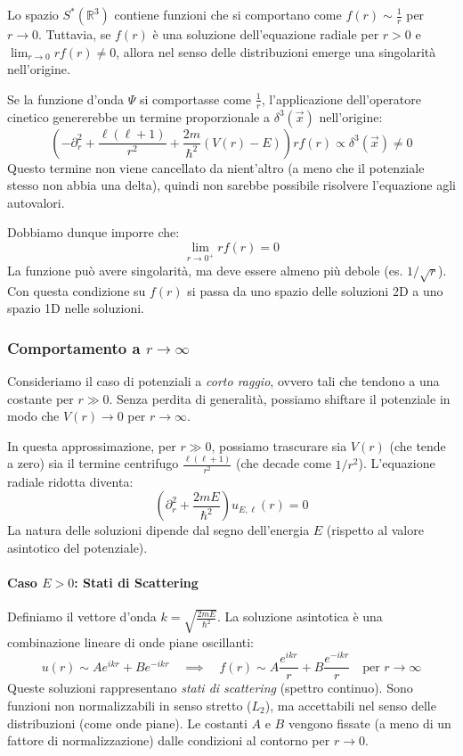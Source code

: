 Lo spazio \( S^*(\mathbb{R}^3) \) contiene funzioni che si comportano come \( f(r) \sim \frac{1}{r} \) per \( r \to 0 \).
Tuttavia, se \( f(r) \) è una soluzione dell'equazione radiale per \( r > 0 \) e \( \lim_{r\to 0} r f(r) \neq 0 \), allora nel senso delle distribuzioni emerge una singolarità nell'origine.

Se la funzione d'onda \( \Psi \) si comportasse come \( \frac{1}{r} \), l'applicazione dell'operatore cinetico genererebbe un termine proporzionale a \( \delta^3(\vec{x}) \) nell'origine:
\[
\left( -\partial_r^2 + \frac{\ell(\ell+1)}{r^2} + \frac{2m}{\hbar^2}(V(r)-E) \right) r f(r) \propto \delta^3(\vec{x}) \neq 0
\]
Questo termine non viene cancellato da nient'altro (a meno che il potenziale stesso non abbia una delta), quindi non sarebbe possibile risolvere l'equazione agli autovalori.

Dobbiamo dunque imporre che:
\begin{equation}
\lim_{r\to 0^+} r f(r) = 0
\end{equation}
La funzione può avere singolarità, ma deve essere almeno più debole (es. \( 1/\sqrt{r} \)). 
Con questa condizione su \( f(r) \) si passa da uno spazio delle soluzioni 2D a uno spazio 1D nelle soluzioni.

\subsubsection{Comportamento a \(r\to \infty\)}
Consideriamo il caso di potenziali a \textit{corto raggio}, ovvero tali che tendono a una costante per $r \gg 0$.
Senza perdita di generalità, possiamo shiftare il potenziale in modo che $V(r) \to 0$ per $r \to \infty$.

In questa approssimazione, per $r \gg 0$, possiamo trascurare sia $V(r)$ (che tende a zero) sia il termine centrifugo $\frac{\ell(\ell+1)}{r^2}$ (che decade come $1/r^2$). L'equazione radiale ridotta diventa:
\begin{equation}
    \left( \partial_r^2 + \frac{2mE}{\hbar^2} \right) u_{E,\ell}(r) = 0
\end{equation}
La natura delle soluzioni dipende dal segno dell'energia $E$ (rispetto al valore asintotico del potenziale).

\paragraph{Caso $E > 0$: Stati di Scattering}
Definiamo il vettore d'onda $k = \sqrt{\frac{2mE}{\hbar^2}}$. La soluzione asintotica è una combinazione lineare di onde piane oscillanti:
\begin{equation}
    u(r) \sim A e^{ikr} + B e^{-ikr} \quad \implies \quad f(r) \sim A \frac{e^{ikr}}{r} + B \frac{e^{-ikr}}{r} \quad \text{per } r \to \infty
\end{equation}
Queste soluzioni rappresentano \textit{stati di scattering} (spettro continuo). Sono funzioni non normalizzabili in senso stretto ($L_2$), ma accettabili nel senso delle distribuzioni (come onde piane).
Le costanti $A$ e $B$ vengono fissate (a meno di un fattore di normalizzazione) dalle condizioni al contorno per $r \to 0$.

